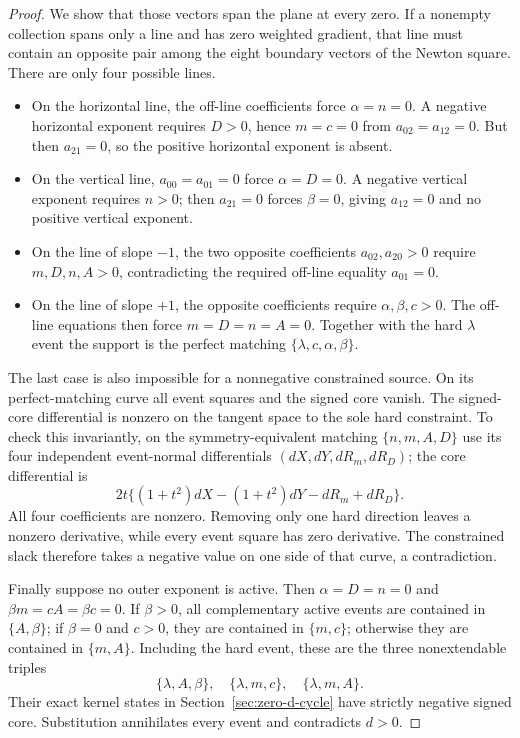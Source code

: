 \begin{proof}
We show that those vectors span the plane at every zero. If a nonempty collection spans only a line and has zero weighted gradient, that line must contain an opposite pair among the eight boundary vectors of the Newton square. There are only four possible lines.
\begin{itemize}
\item On the horizontal line, the off-line coefficients force $\alpha=n=0$. A negative horizontal exponent requires $D>0$, hence $m=c=0$ from $a_{02}=a_{12}=0$. But then $a_{21}=0$, so the positive horizontal exponent is absent.
\item On the vertical line, $a_{00}=a_{01}=0$ force $\alpha=D=0$. A negative vertical exponent requires $n>0$; then $a_{21}=0$ forces $\beta=0$, giving $a_{12}=0$ and no positive vertical exponent.
\item On the line of slope $-1$, the two opposite coefficients $a_{02},a_{20}>0$ require $m,D,n,A>0$, contradicting the required off-line equality $a_{01}=0$.
\item On the line of slope $+1$, the opposite coefficients require $\alpha,\beta,c>0$. The off-line equations then force $m=D=n=A=0$. Together with the hard $\lambda$ event the support is the perfect matching $\{\lambda,c,\alpha,\beta\}$.
\end{itemize}
The last case is also impossible for a nonnegative constrained source. On its perfect-matching curve all event squares and the signed core vanish. The signed-core differential is nonzero on the tangent space to the sole hard constraint. To check this invariantly, on the symmetry-equivalent matching $\{n,m,A,D\}$ use its four independent event-normal differentials $(dX,dY,dR_m,dR_D)$; the core differential is
\[
2t\{(1+t^2)dX-(1+t^2)dY-dR_m+dR_D\}.
\]
All four coefficients are nonzero. Removing only one hard direction leaves a nonzero derivative, while every event square has zero derivative. The constrained slack therefore takes a negative value on one side of that curve, a contradiction.

Finally suppose no outer exponent is active. Then $\alpha=D=n=0$ and
$\beta m=cA=\beta c=0$. If $\beta>0$, all complementary active events are contained in $\{A,\beta\}$; if $\beta=0$ and $c>0$, they are contained in $\{m,c\}$; otherwise they are contained in $\{m,A\}$. Including the hard event, these are the three nonextendable triples
\[
\{\lambda,A,\beta\},\quad \{\lambda,m,c\},\quad \{\lambda,m,A\}.
\]
Their exact kernel states in Section~\ref{sec:zero-d-cycle} have strictly negative signed core. Substitution annihilates every event and contradicts $d>0$.


\end{proof}
